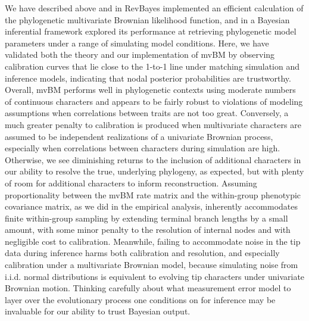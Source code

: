 We have described above and in RevBayes implemented an efficient calculation of the phylogenetic multivariate Brownian likelihood function, and in a Bayesian inferential framework explored its performance at retrieving phylogenetic model parameters under a range of simulating model conditions. Here, we have validated both the theory and our implementation of mvBM by observing calibration curves that lie close to the 1-to-1 line under matching simulation and inference models, indicating that nodal posterior probabilities are trustworthy. Overall, mvBM performs well in phylogenetic contexts using moderate numbers of continuous characters and appears to be fairly robust to violations of modeling assumptions when correlations between traits are not too great. Conversely, a much greater penalty to calibration is produced when multivariate characters are assumed to be independent realizations of a univariate Brownian process, especially when correlations between characters during simulation are high. Otherwise, we see diminishing returns to the inclusion of additional characters in our ability to resolve the true, underlying phylogeny, as expected, but with plenty of room for additional characters to inform reconstruction. Assuming proportionality between the mvBM rate matrix and the within-group phenotypic covariance matrix, as we did in the empirical analysis, inherently accommodates finite within-group sampling by extending terminal branch lengths by a small amount, with some minor penalty to the resolution of internal nodes and with negligible cost to calibration. Meanwhile, failing to accommodate noise in the tip data during inference harms both calibration and resolution, and especially calibration under a multivariate Brownian model, because simulating noise from i.i.d. normal distributions is equivalent to evolving tip characters under univariate Brownian motion. Thinking carefully about what measurement error model to layer over the evolutionary process one conditions on for inference may be invaluable for our ability to trust Bayesian output.

